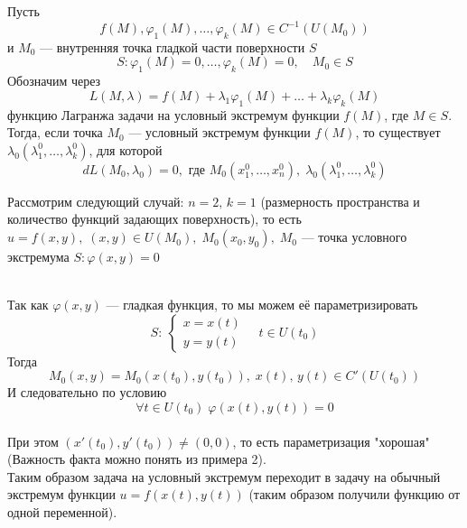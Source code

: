 \begin{Th}
    Пусть 
    \[
        f(M), \varphi_1(M), \dots, \varphi_k(M) \in C^{-1}(U(M_0))
    \] 
    и $M_0$ --- внутренняя точка гладкой части поверхности $S$ 
    \[
        S: \varphi_1(M) = 0, \dots, \varphi_k(M) = 0, \quad M_0 \in S
    \]
    Обозначим через 
    \[
        L(M, \lambda) = f(M) + \lambda_1\varphi_1(M) + \dots + \lambda_k\varphi_k(M)
    \]
    функцию Лагранжа задачи на условный экстремум функции $f(M)$, где $M \in S$. Тогда, если точка $M_0$ --- условный экстремум функции $f(M)$, то существует $\lambda_0(\lambda^0_1, \dots, \lambda^0_k)$, для которой
    \[
        dL(M_0, \lambda_0) = 0, \text{ где }  M_0(x^0_1, \dots, x^0_n), \; \lambda_0(\lambda^0_1, \dots, \lambda^0_k)
    \]
\end{Th}
\begin{Proof}
    Рассмотрим следующий случай: $n = 2, \, k = 1$ (размерность пространства и количество функций задающих поверхность), то есть $u = f(x, y), \; (x, y) \in U(M_0), \; M_0(x_0, y_0), \; M_0$ --- точка условного экстремума $S : \varphi(x, y) = 0$
    \begin{figure}[h!]
        \noindent{}
    \end{figure}\\
    Так как $\varphi(x, y)$ --- гладкая функция, то мы можем её параметризировать
    \[
        S :\: \begin{cases} 
            x = x(t)\\
            y = y(t)
          \end{cases} \quad t \in U(t_0)
    \]
    Тогда 
    \[
        M_0(x, y) = M_0(x(t_0), y(t_0)), \; x(t), \, y(t) \in C'(U(t_0))
    \]
    И следовательно по условию 
    \[
        \forall t \in U(t_0) \; \varphi(x(t), y(t)) = 0
    \]\\
    При этом $(x'(t_0), y'(t_0)) \neq (0, 0)$, то есть параметризация "хорошая" (Важность факта можно понять из примера 2).\\
    Таким образом задача на условный экстремум переходит в задачу на обычный экстремум функции $u = f(x(t), y(t))$ (таким образом получили функцию от одной переменной).\\

\end{Proof}

